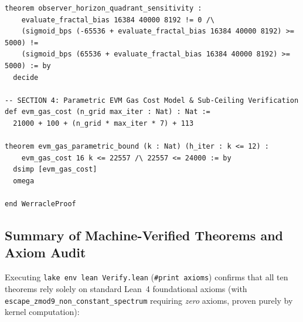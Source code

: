 \documentclass[10pt,a4paper]{article}
\begin{document}
\begin{lstlisting}[language=Lean4,caption={Complete verified Lean 4 proof module (\texttt{WerracleProof.lean}, compiled under Lean \texttt{v4.34.1} + Mathlib4, 0 \texttt{sorry}).}]
theorem observer_horizon_quadrant_sensitivity :
    evaluate_fractal_bias 16384 40000 8192 != 0 /\
    (sigmoid_bps (-65536 + evaluate_fractal_bias 16384 40000 8192) >= 5000) !=
    (sigmoid_bps (65536 + evaluate_fractal_bias 16384 40000 8192) >= 5000) := by
  decide

-- SECTION 4: Parametric EVM Gas Cost Model & Sub-Ceiling Verification
def evm_gas_cost (n_grid max_iter : Nat) : Nat :=
  21000 + 100 + (n_grid * max_iter * 7) + 113

theorem evm_gas_parametric_bound (k : Nat) (h_iter : k <= 12) :
    evm_gas_cost 16 k <= 22557 /\ 22557 <= 24000 := by
  dsimp [evm_gas_cost]
  omega

end WerracleProof
\end{lstlisting}

\subsection{Summary of Machine-Verified Theorems and Axiom Audit}
Executing \texttt{lake env lean Verify.lean} (\texttt{\#print axioms}) confirms that all ten theorems rely solely on standard Lean~4 foundational axioms (with \texttt{escape\_zmod9\_non\_constant\_spectrum} requiring \emph{zero} axioms, proven purely by kernel computation):
\end{document}
